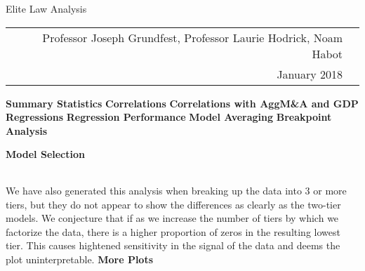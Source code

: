 \documentclass{article}
\begin{document}
\begin{center}{\LARGE Elite Law Analysis}
\\
\begin{tabular}{rl}\\Professor Joseph Grundfest, Professor Laurie Hodrick, Noam Habot \\January 2018\end{tabular}\end{center}{\large \textbf{Summary Statistics} }
\newpage
{\large \textbf{Correlations} }
\newpage
{\large \textbf{Correlations with AggM\&A and GDP} }
\newpage
{\large \textbf{Regressions} }
\newpage
{\large \textbf{Regression Performance} }
\newpage
{\large \textbf{Model Averaging} }
\newpage
{\large \textbf{Breakpoint Analysis} }
\newpage

{\large \textbf{Model Selection} }
\begin{figure}[H]
\centering
\begin{tabular}{cccc}
\end{tabular}
\end{figure}
We have also generated this analysis when breaking up the data into 3 or more tiers, but they do not appear to show the differences as clearly as the two-tier models. We conjecture that if as we increase the number of tiers by which we factorize the data, there is a higher proportion of zeros in the resulting lowest tier. This causes hightened sensitivity in the signal of the data and deems the plot uninterpretable.
\newpage
{\large \textbf{More Plots} }
\newpage
\end{document}
